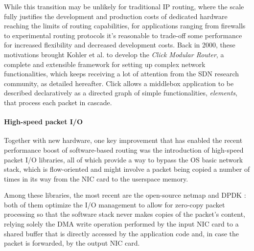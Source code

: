 \documentclass[12pt,a4paper,twoside]{book}
\begin{document}

While this transition may be unlikely for traditional IP routing, where the scale fully justifies the development and production costs of dedicated hardware reaching the limits of routing capabilities, for applications ranging from firewalls to experimental routing protocols it's reasonable to trade-off some performance for increased flexibility and decreased development costs.
Back in 2000, these motivations brought Kohler et al. \cite{click} to develop the \textit{Click Modular Router}, a complete and extensible framework for setting up complex network functionalities, which keeps receiving a lot of attention from the \gls{SDN} research community, as detailed hereafter. Click allows a middlebox application to be described declaratively as a directed graph of simple functionalities, \emph{elements}, that process each packet in cascade. %

\paragraph{High-speed packet I/O} Together with new hardware, one key improvement that has enabled the recent performance boost of software-based routing was the introduction of high-speed packet I/O libraries, all of which provide a way to bypass the OS basic network stack, which is flow-oriented and might involve a packet being copied a number of times in its way from the NIC card to the userspace memory. %

Among these libraries, the most recent are the open-source netmap\cite{netmap} and DPDK\cite{dpdk}%
: both of them optimize the I/O management to allow for zero-copy packet processing so that the software stack never makes copies of the packet's content, relying solely the \gls{DMA} write operation performed by the input NIC card to a shared buffer that is directly accessed by the application code and, in case the packet is forwarded, by the output NIC card.
\end{document}
